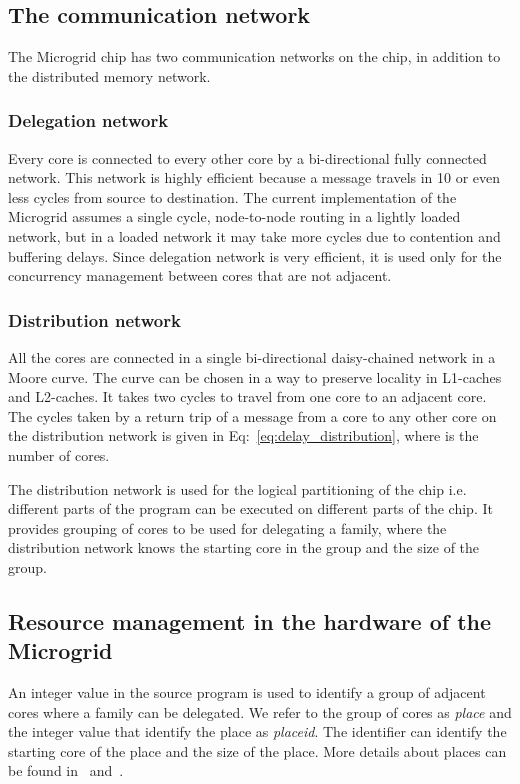 \documentclass{article}
\begin{document}
\subsection{The communication network}\label{com_network}

The Microgrid chip has two communication networks on the chip, in addition to
the distributed memory network. 

\subsubsection*{Delegation network}

Every core is connected to every other core by a bi-directional fully connected
network. This network is highly efficient because a message travels in 10 or
even less cycles from source to destination. The current implementation of the
Microgrid assumes a single cycle, node-to-node routing in a lightly loaded
network, but in a loaded network it may take more cycles due to contention and
buffering delays. Since delegation network is very efficient, it is used only
for the concurrency management between cores that are not adjacent.

\subsubsection*{Distribution network}

All the cores are connected in a single bi-directional daisy-chained network in
a Moore curve. The curve can be chosen in a way to preserve locality in
L1-caches and L2-caches. It takes two cycles to travel from one core to an
adjacent core. The cycles taken by a return trip of a message from a core to
any other core on the distribution network is given
in Eq:~\ref{eq:delay_distribution}, where  is the number of cores. 



The distribution network is used for the logical partitioning of the chip i.e.
different parts of the program can be executed on different parts of the chip.
It provides grouping of cores to be used for delegating a family, where the
distribution network knows the starting core in the group and the size of the
group.

\subsection{Resource management in the hardware of the Microgrid}

An integer value in the source program is used to identify a group of adjacent
cores where a family can be delegated. We refer to the group of cores as
\emph{place} and the integer value that identify the place as \emph{placeid}.
The identifier can identify the starting core of the place and the size of the
place. More details about places can be found in~\cite{place_mgsim,poss.12.sl}
and~\cite[Chap.~11 \& App.~E]{poss.12}.
\end{document}
